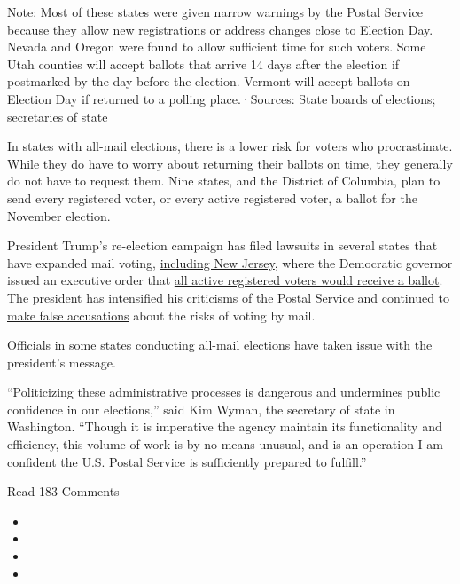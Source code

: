 Note: Most of these states were given narrow warnings by the Postal
Service because they allow new registrations or address changes close to
Election Day. Nevada and Oregon were found to allow sufficient time for
such voters. Some Utah counties will accept ballots that arrive 14 days
after the election if postmarked by the day before the election. Vermont
will accept ballots on Election Day if returned to a polling
place.·Sources: State boards of elections; secretaries of state

In states with all-mail elections, there is a lower risk for voters who
procrastinate. While they do have to worry about returning their ballots
on time, they generally do not have to request them. Nine states, and
the District of Columbia, plan to send every registered voter, or every
active registered voter, a ballot for the November election.

President Trump's re-election campaign has filed lawsuits in several
states that have expanded mail voting,
\href{https://www.courtlistener.com/recap/gov.uscourts.njd.442794/gov.uscourts.njd.442794.1.0.pdf}{including
New Jersey}, where the Democratic governor issued an executive order
that
\href{https://www.nytimes3xbfgragh.onion/2020/08/14/nyregion/nj-vote-by-mail-election.html}{all
active registered voters would receive a ballot}. The president has
intensified his
\href{https://www.nytimes3xbfgragh.onion/2020/07/31/us/politics/trump-usps-mail-delays.html}{criticisms
of the Postal Service} and
\href{https://www.nytimes3xbfgragh.onion/article/mail-in-vote-fraud-ballot.html}{continued
to make false accusations} about the risks of voting by mail.

Officials in some states conducting all-mail elections have taken issue
with the president's message.

``Politicizing these administrative processes is dangerous and
undermines public confidence in our elections,'' said Kim Wyman, the
secretary of state in Washington. ``Though it is imperative the agency
maintain its functionality and efficiency, this volume of work is by no
means unusual, and is an operation I am confident the U.S. Postal
Service is sufficiently prepared to fulfill.''

Read 183 Comments

\begin{itemize}
\item
\item
\item
\item
\end{itemize}

